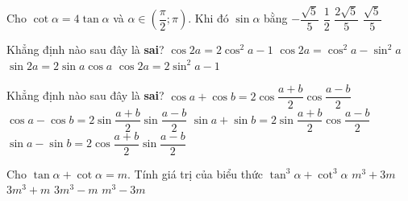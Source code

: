 \begin{ex}%
	Cho $\cot \alpha =4\tan \alpha $ và $\alpha \in \left( \dfrac{\pi}{2};\pi \right)$. Khi đó $\sin \alpha $ bằng
	\choice
	{$-\dfrac{\sqrt{5}}{5}$}
	{$\dfrac{1}{2}$}
	{$\dfrac{2\sqrt{5}}{5}$}
	{\True $\dfrac{\sqrt{5}}{5}$}
\end{ex}
\begin{ex}%
	Khẳng định nào sau đây là \textbf{sai}?
	\choice
	{$\cos 2a=2\cos^2 a-1$}
	{$\cos 2a=\cos^2 a-{\sin ^2}a$}
	{$\sin 2a=2\sin a\cos a$}
	{\True $\cos 2a=2{\sin ^2}a-1$}
\end{ex}
\begin{ex}%
	Khẳng định nào sau đây là \textbf{sai}?
	\choice
	{$\cos a+\cos b=2\cos \dfrac{a+b}{2}\cos \dfrac{a-b}{2}$}
	{\True $\cos a-\cos b=2\sin \dfrac{a+b}{2}\sin \dfrac{a-b}{2}$}
	{$\sin a+\sin b=2\sin \dfrac{a+b}{2}\cos \dfrac{a-b}{2}$}
	{$\sin a-\sin b=2\cos \dfrac{a+b}{2}\sin \dfrac{a-b}{2}$}
\end{ex}
\begin{ex}%
	Cho $\tan \alpha +\cot \alpha =m$. Tính giá trị của biểu thức $\tan^3 \alpha +\cot^3 \alpha $
	\choice
	{$m^3+3m$}
	{$3m^3+m$}
	{$3m^3-m$}
	{\True $m^3-3m$}
\end{ex}
